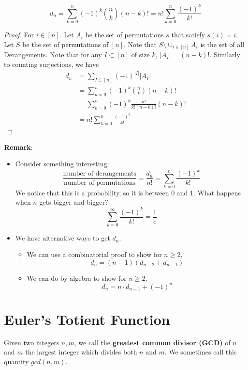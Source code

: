 \begin{theorem}
    $$d_n=\sum_{k=0}^n(-1)^k{n \choose k}(n-k)!=n!\sum_{k=0}^n\frac{(-1)^k}{k!}$$
\end{theorem}
\begin{proof}
    For $i \in[n]$. Let $A_i$ be the set of permutations $s$ that satisfy $s(i)=i$. 
    Let $S$ be the set of permutations of $[n]$. 
    Note that $S \setminus \cup_{i \in [n]}A_i$ is the set of all Derangements. 
    Note that for any $I \subset [n]$ of size $k$, $|A_I|=(n-k)!$. 
    Similarly to counting surjections, we have
    \begin{equation}
        \begin{split}
            d_n &= \sum_{I \subset [n]}(-1)^{|I|}|A_I|\\
        &= \sum_{k=0}^n(-1)^k{n \choose k}(n-k)!\\
        &= \sum_{k=0}^n(-1)^k \frac{n!}{k!(n-k)!}(n-k)!\\
        &= n!\sum_{k=0}^n\frac{(-1)^k}{k!}
        \end{split}
    \end{equation}
\end{proof}
\textbf{Remark}:
\begin{itemize}
    \item Consider something interesting:
    $$\frac{\text{number of derangements}}{\text{number of permutations}}=\frac{d_n}{n!}=\sum_{k=0}^n\frac{(-1)^k}{k!}$$
    We notice that this is a probability, so it is between 0 and 1. What happens when $n$ gets bigger and bigger?
    $$\sum_{k=0}^{\infty}\frac{(-1)^k}{k!}=\frac{1}{e}$$
    \item We have alternative ways to get $d_n$.
    \begin{itemize}
        \item We can use a combinatorial proof to show for $n \geq 2$, $$d_n=(n-1)(d_{n-2}+d_{n-1})$$
        \item We can do by algebra to show for $n \geq 2$, $$d_n=n \cdot d_{n-1}+(-1)^n$$
    \end{itemize}
\end{itemize}


\section{Euler's Totient Function}

\begin{definition}
    Given two integers $n,m$, we call the \textbf{greatest common divisor (GCD)} of $n$ and $m$ the largest integer which divides both $n$ and $m$. 
    We sometimes call this quantity $gcd(n,m)$.
\end{definition}

